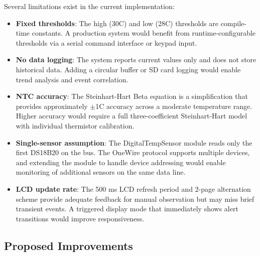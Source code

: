 Several limitations exist in the current implementation:
\begin{itemize}
    \item \textbf{Fixed thresholds}: The high (30\textdegree C) and low (28\textdegree C) thresholds are compile-time constants. A production system would benefit from runtime-configurable thresholds via a serial command interface or keypad input.
    \item \textbf{No data logging}: The system reports current values only and does not store historical data. Adding a circular buffer or SD card logging would enable trend analysis and event correlation.
    \item \textbf{NTC accuracy}: The Steinhart-Hart Beta equation is a simplification that provides approximately $\pm$1\textdegree C accuracy across a moderate temperature range. Higher accuracy would require a full three-coefficient Steinhart-Hart model with individual thermistor calibration.
    \item \textbf{Single-sensor assumption}: The DigitalTempSensor module reads only the first DS18B20 on the bus. The OneWire protocol supports multiple devices, and extending the module to handle device addressing would enable monitoring of additional sensors on the same data line.
    \item \textbf{LCD update rate}: The 500 ms LCD refresh period and 2-page alternation scheme provide adequate feedback for manual observation but may miss brief transient events. A triggered display mode that immediately shows alert transitions would improve responsiveness.
\end{itemize}

\subsection{Proposed Improvements}

